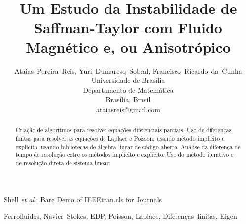 \documentclass[journal]{IEEEtran}
\begin{document}
\title{Um Estudo da Instabilidade de Saffman-Taylor com Fluido Magnético e, ou Anisotrópico}


\author{Ataias~Pereira~Reis, Yuri~Dumaresq~Sobral, Francisco~Ricardo~da~Cunha\\Universidade de Brasília\\Departamento de Matemática\\Brasília, Brasil\\ataiasreis@gmail.com}

%
{Shell \MakeLowercase{\textit{et al.}}: Bare Demo of IEEEtran.cls for Journals}

\maketitle


\begin{abstract}
Criação de algoritmos para resolver equações diferenciais parciais. Uso de diferenças finitas para resolver as equações de Laplace e Poisson, usando método ímplicito e explícito, usando bibliotecas de álgebra linear de código aberto. Análise da diferença de tempo de resolução entre os métodos implícito e explícito. Uso do método iterativo e de resolução direta de sistema linear. 
\end{abstract}

\begin{IEEEkeywords}
Ferrofluidos, Navier~Stokes, EDP, Poisson, Laplace, Diferenças~finitas, Eigen
\end{IEEEkeywords}

%
\IEEEpeerreviewmaketitle
\end{document}
